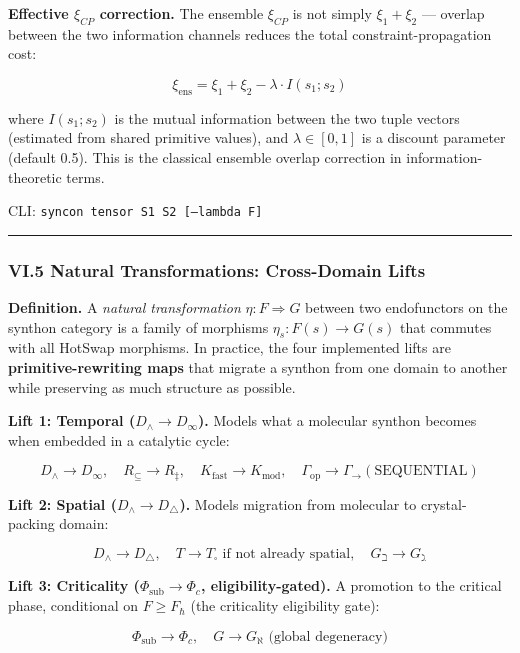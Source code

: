 \documentclass[12pt,a4paper]{article}
\begin{document}
\textbf{Effective $\xi_{CP}$ correction.} The ensemble $\xi_{CP}$ is not simply $\xi_1 + \xi_2$ --- overlap between the two information channels reduces the total constraint-propagation cost:

\[\xi_{\text{ens}} = \xi_1 + \xi_2 - \lambda \cdot I(s_1; s_2)\]

where $I(s_1; s_2)$ is the mutual information between the two tuple vectors (estimated from shared primitive values), and $\lambda \in [0, 1]$ is a discount parameter (default 0.5). This is the classical ensemble overlap correction in information-theoretic terms.

CLI: \texttt{syncon tensor S1 S2 {[}--lambda F{]}}

\begin{center}
\rule{0.5\textwidth}{0.4pt}
\end{center}

\subsubsection{VI.5 Natural Transformations: Cross-Domain Lifts}

\textbf{Definition.} A \emph{natural transformation} $\eta: F \Rightarrow G$ between two endofunctors on the synthon category is a family of morphisms $\eta_s: F(s) \to G(s)$ that commutes with all HotSwap morphisms. In practice, the four implemented lifts are \textbf{primitive-rewriting maps} that migrate a synthon from one domain to another while preserving as much structure as possible.

\textbf{Lift 1: Temporal ($D_{\wedge} \to D_{\infty}$).} Models what a molecular synthon becomes when embedded in a catalytic cycle:

\[D_{\wedge} \to D_{\infty}, \quad R_{\subseteq} \to R_{\ddagger}, \quad K_{\text{fast}} \to K_{\text{mod}}, \quad \Gamma_{\text{op}} \to \Gamma_{\to}(\text{SEQUENTIAL})\]

\textbf{Lift 2: Spatial ($D_{\wedge} \to D_{\bigtriangleup}$).} Models migration from molecular to crystal-packing domain:

\[D_{\wedge} \to D_{\bigtriangleup}, \quad T \to T_{\square} \text{ if not already spatial}, \quad G_{\beth} \to G_{\gimel}\]

\textbf{Lift 3: Criticality ($\Phi_{\text{sub}} \to \Phi_c$, eligibility-gated).} A promotion to the critical phase, conditional on $F \geq F_{\hbar}$ (the criticality eligibility gate):

\[\Phi_{\text{sub}} \to \Phi_c, \quad G \to G_{\aleph} \text{ (global degeneracy)}\]
\end{document}
